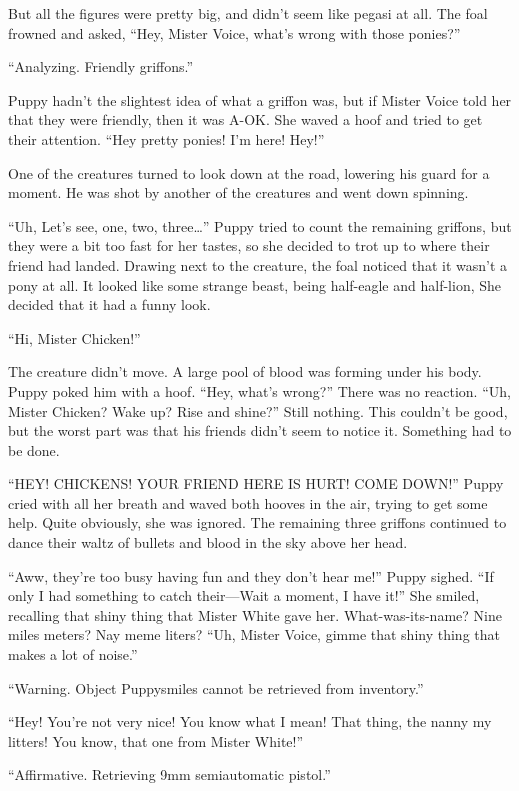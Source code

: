 But all the figures were pretty big, and didn't seem like pegasi at all. The foal frowned and asked, ``Hey, Mister Voice, what's wrong with those ponies?''

{\mt ``Analyzing. Friendly griffons.''}

Puppy hadn't the slightest idea of what a griffon was, but if Mister Voice told her that they were friendly, then it was A-OK. She waved a hoof and tried to get their attention. ``Hey pretty ponies! I'm here! Hey!''

One of the creatures turned to look down at the road, lowering his guard for a moment. He was shot by another of the creatures and went down spinning.

``Uh, Let's see, one, two, three\dots'' Puppy tried to count the remaining griffons, but they were a bit too fast for her tastes, so she decided to trot up to where their friend had landed. Drawing next to the creature, the foal noticed that it wasn't a pony at all. It looked like some strange beast, being half-eagle and half-lion, She decided that it had a funny look.

``Hi, Mister Chicken!''

The creature didn't move. A large pool of blood was forming under his body. Puppy poked him with a hoof. ``Hey, what's wrong?'' There was no reaction. ``Uh, Mister Chicken? Wake up? Rise and shine?'' Still nothing. This couldn't be good, but the worst part was that his friends didn't seem to notice it. Something had to be done.

``HEY! CHICKENS! YOUR FRIEND HERE IS HURT! COME DOWN!'' Puppy cried with all her breath and waved both hooves in the air, trying to get some help. Quite obviously, she was ignored. The remaining three griffons continued to dance their waltz of bullets and blood in the sky above her head.

``Aww, they're too busy having fun and they don't hear me!'' Puppy sighed. ``If only I had something to catch their---Wait a moment, I have it!'' She smiled, recalling that shiny thing that Mister White gave her. What-was-its-name? Nine miles meters? Nay meme liters? ``Uh, Mister Voice, gimme that shiny thing that makes a lot of noise.''

{\mt ``Warning. Object Puppysmiles cannot be retrieved from inventory.''}

``Hey! You're not very nice! You know what I mean! That thing, the nanny my litters! You know, that one from Mister White!''

{\mt ``Affirmative. Retrieving 9mm semiautomatic pistol.''}

